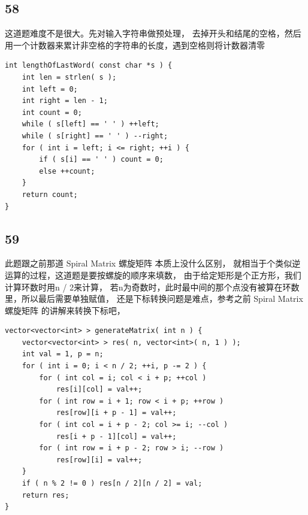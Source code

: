 \documentclass[12pt,a4paper]{article}
\begin{document}
\subsection{58}
\begin{CJK}{UTF8}{gbsn}
这道题难度不是很大。先对输入字符串做预处理，
去掉开头和结尾的空格，然后用一个计数器来累计非空格的字符串的长度，遇到空格则将计数器清零
\end{CJK}
\begin{lstlisting}
int lengthOfLastWord( const char *s ) {
	int len = strlen( s );
	int left = 0;
	int right = len - 1;
	int count = 0;
	while ( s[left] == ' ' ) ++left;
	while ( s[right] == ' ' ) --right;
	for ( int i = left; i <= right; ++i ) {
		if ( s[i] == ' ' ) count = 0;
		else ++count;
	}
	return count;
}
\end{lstlisting}

\subsection{59}
\begin{CJK}{UTF8}{gbsn}
此题跟之前那道 Spiral Matrix 螺旋矩阵 本质上没什么区别，
就相当于个类似逆运算的过程，这道题是要按螺旋的顺序来填数，
由于给定矩形是个正方形，我们计算环数时用n / 2来计算，
若n为奇数时，此时最中间的那个点没有被算在环数里，所以最后需要单独赋值，
还是下标转换问题是难点，参考之前 Spiral Matrix 螺旋矩阵 的讲解来转换下标吧，
\end{CJK}
\begin{lstlisting}
vector<vector<int> > generateMatrix( int n ) {
	vector<vector<int> > res( n, vector<int>( n, 1 ) );
	int val = 1, p = n;
	for ( int i = 0; i < n / 2; ++i, p -= 2 ) {
		for ( int col = i; col < i + p; ++col )
			res[i][col] = val++;
		for ( int row = i + 1; row < i + p; ++row )
			res[row][i + p - 1] = val++;
		for ( int col = i + p - 2; col >= i; --col )
			res[i + p - 1][col] = val++;
		for ( int row = i + p - 2; row > i; --row )
			res[row][i] = val++;
	}
	if ( n % 2 != 0 ) res[n / 2][n / 2] = val;
	return res;
}
\end{lstlisting}
\end{document}
